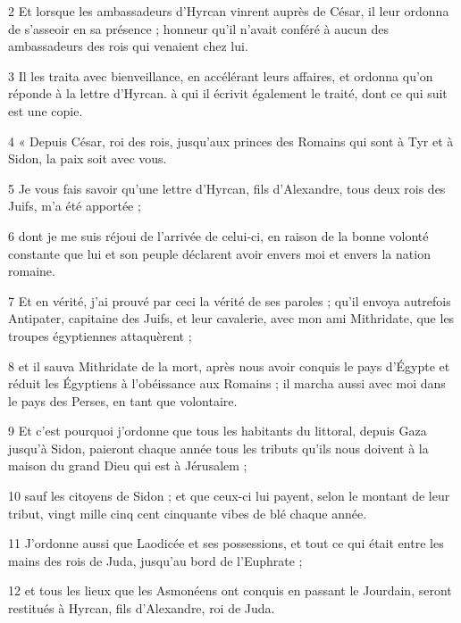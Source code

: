 \par 2 Et lorsque les ambassadeurs d'Hyrcan vinrent auprès de César, il leur ordonna de s'asseoir en sa présence ; honneur qu'il n'avait conféré à aucun des ambassadeurs des rois qui venaient chez lui.

\par 3 Il les traita avec bienveillance, en accélérant leurs affaires, et ordonna qu'on réponde à la lettre d'Hyrcan. à qui il écrivit également le traité, dont ce qui suit est une copie.

\par 4 « Depuis César, roi des rois, jusqu'aux princes des Romains qui sont à Tyr et à Sidon, la paix soit avec vous.

\par 5 Je vous fais savoir qu'une lettre d'Hyrcan, fils d'Alexandre, tous deux rois des Juifs, m'a été apportée ;

\par 6 dont je me suis réjoui de l'arrivée de celui-ci, en raison de la bonne volonté constante que lui et son peuple déclarent avoir envers moi et envers la nation romaine.

\par 7 Et en vérité, j'ai prouvé par ceci la vérité de ses paroles ; qu'il envoya autrefois Antipater, capitaine des Juifs, et leur cavalerie, avec mon ami Mithridate, que les troupes égyptiennes attaquèrent ;

\par 8 et il sauva Mithridate de la mort, après nous avoir conquis le pays d'Égypte et réduit les Égyptiens à l'obéissance aux Romains ; il marcha aussi avec moi dans le pays des Perses, en tant que volontaire.

\par 9 Et c'est pourquoi j'ordonne que tous les habitants du littoral, depuis Gaza jusqu'à Sidon, paieront chaque année tous les tributs qu'ils nous doivent à la maison du grand Dieu qui est à Jérusalem ;

\par 10 sauf les citoyens de Sidon ; et que ceux-ci lui payent, selon le montant de leur tribut, vingt mille cinq cent cinquante vibes de blé chaque année.

\par 11 J'ordonne aussi que Laodicée et ses possessions, et tout ce qui était entre les mains des rois de Juda, jusqu'au bord de l'Euphrate ;

\par 12 et tous les lieux que les Asmonéens ont conquis en passant le Jourdain, seront restitués à Hyrcan, fils d'Alexandre, roi de Juda.

